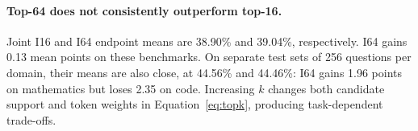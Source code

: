 \paragraph{Top-64 does not consistently outperform top-16.}
Joint I16 and I64 endpoint means are 38.90\% and 39.04\%, respectively. I64 gains 0.13 mean points on these benchmarks. On separate test sets of 256 questions per domain, their means are also close, at 44.56\% and 44.46\%: I64 gains 1.96 points on mathematics but loses 2.35 on code. Increasing $k$ changes both candidate support and token weights in Equation~\ref{eq:topk}, producing task-dependent trade-offs.
